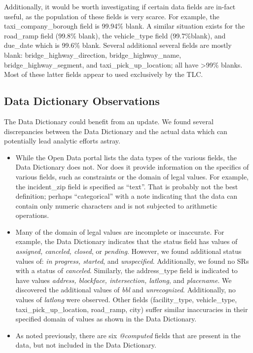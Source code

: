 \documentclass[12pt, titlepage]{article}
\begin{document}
 	
Additionally, it would be worth investigating if certain data fields are 
in-fact useful, as the population of these fields is very scarce. For 
example, the taxi\_company\_borough field is 99.94\% 
blank. A similar situation exists for the road\_ramp field 
(99.8\% blank), the vehicle\_type field (99.7\%blank), and 
due\_date which is 99.6\% blank. Several additional several fields
are mostly blank: bridge\_highway\_direction, bridge\_highway\_name, 
bridge\_highway\_segment, and taxi\_pick\_up\_location; all 
have \textgreater99\% blanks. Most of these latter fields 
appear to used exclusively by the TLC.  


\subsection{Data Dictionary Observations} 
\label{sec:datadictionary}
The Data Dictionary could benefit from an update. We found several 
discrepancies between the Data Dictionary and the 
actual data which can potentially lead analytic efforts astray. 

\begin{itemize}
	\item While the Open Data portal lists the data types of the 
	various fields, the Data Dictionary does not. Nor does it provide 
	information on the specifics of various fields, such 
	as constraints or the domain of legal values. For example, the 
	incident\_zip field is specified as ``text''. That is probably not the 
	best definition; perhaps	``categorical'' with a note indicating that 
	the data can contain only numeric characters and is 
	not subjected to arithmetic operations. 

	\item Many of the domain of legal values are incomplete or 
	inaccurate. For example, the Data Dictionary indicates that 
	the status field has values of \textit{assigned, canceled, closed}, 
	or \textit{pending}. However, we found additional status 
	values of: \textit{in progress, started}, and \textit{unspecified}. 
	Additionally, we found no SRs with a status of \textit{canceled}. 
	Similarly, the address\_type field is indicated to have 
	values \textit{address, blockface, intersection, latlong}, and 
	\textit{placename}. We discovered the additional values of 
	\textit{bbl} and \textit{unrecognized}. Additionally, no values of 
	\textit{latlong} were observed. Other fields (facility\_type, 
	vehicle\_type, taxi\_pick\_up\_location, road\_ramp, city) 
	suffer similar inaccuracies in their specified domain of values as
	shown in the Data Dictionary.
	
	\item As noted previously, there are six \textit{@computed} fields that
	are present in the data, but not included in the Data Dictionary.
\end{itemize}
\end{document}

